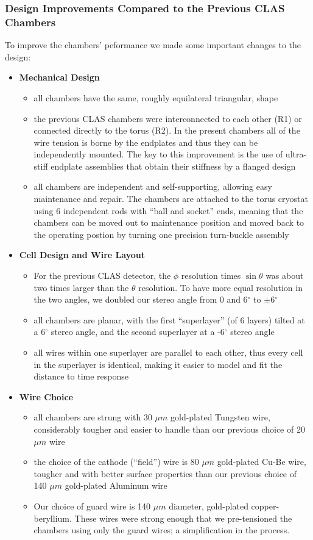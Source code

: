 \subsubsection{Design Improvements Compared to the Previous CLAS Chambers}
To improve the chambers' peformance we made some important changes to the design:
\begin{itemize}
\item {\bf Mechanical Design}
\begin{itemize}
\item all chambers have the same, roughly equilateral triangular, shape
\item the previous CLAS chambers were interconnected to each other (R1) or 
connected directly to the torus (R2).  In the present chambers all of the wire tension
is borne by the endplates and thus they can be independently mounted.
The key to this improvement is the use of  
ultra-stiff endplate assemblies that obtain their stiffness 
by a flanged design
\item all chambers are independent and self-supporting, allowing easy
maintenance and repair.  The chambers are attached to the torus cryostat using 6 independent
rods with ``ball and socket'' ends, meaning that the chambers can be
moved out to maintenance position and moved back to the operating 
postion by turning one precision turn-buckle assembly
\end{itemize}
\item {\bf Cell Design and Wire Layout}
\begin{itemize}  
\item For the previous CLAS detector, the $\phi$ resolution times $\sin \theta$ was about two 
times larger than the $\theta$ resolution.  To have more equal resolution in 
the two angles, we doubled our stereo angle from 0 and 6$^\circ$ to 
$\pm$6$^\circ$
\item all chambers are planar, with the first ``superlayer'' (of 6 layers)
tilted at a 6$^\circ$ stereo angle, and the second superlayer at a -6$^\circ$ stereo
angle
\item all wires within one superlayer are parallel to each other, thus
every cell in the superlayer is identical, making it easier to model
and fit the distance to time response
\end{itemize}
\item {\bf Wire Choice}
\begin{itemize}
\item all chambers are strung with 30 $\mu m$ gold-plated Tungsten wire,
considerably tougher and easier to handle than our previous choice 
of 20 $\mu m$ wire
\item the choice of the cathode (``field'') wire is 80 $\mu m$ gold-plated
Cu-Be wire, tougher and with better surface properties than our previous
choice of 140 $\mu m$ gold-plated Aluminum wire
\item  Our choice of guard wire is 140 $\mu m$ diameter, gold-plated
copper-beryllium.  These wires were strong enough that we pre-tensioned 
the chambers using only the guard wires; a simplification in the process.
\end{itemize}
\end{itemize}



